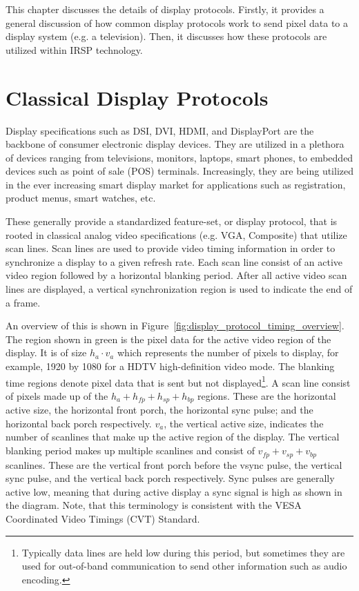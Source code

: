\label{chap:display_protocls}
This chapter discusses the details of display protocols. Firstly, it provides a general discussion of how common display protocols work to send pixel data to a display system (e.g. a television). Then, it discusses how these protocols are utilized within IRSP technology.

\section{Classical Display Protocols}
    \label{sec:classical_display_protocols}

    Display specifications such as DSI\cite{HDMIForum2017}, DVI\cite{DDWG1999}, HDMI\cite{HDMIForum2018}, and DisplayPort\cite{VESA2016} are the backbone of consumer electronic display devices. They are utilized in a plethora of devices ranging from televisions, monitors, laptops, smart phones, to embedded devices such as point of sale (POS) terminals. Increasingly, they are being utilized in the ever increasing smart display market for applications such as registration, product menus, smart watches, etc.

    These generally provide a standardized feature-set, or display protocol, that is rooted in classical analog video specifications (e.g. VGA, Composite)\cite{NIAnalog} that utilize scan lines\cite{Neal1998}. Scan lines are used to provide video timing information in order to synchronize a display to a given refresh rate. Each scan line consist of an active video region followed by a horizontal blanking period. After all active video scan lines are displayed, a vertical synchronization region is used to indicate the end of a frame.


    An overview of this is shown in Figure~\ref{fig:display_protocol_timing_overview}. The region shown in green is the pixel data for the active video region of the display. It is of size $h_a\cdot v_a$ which represents the number of pixels to display, for example, 1920 by 1080 for a HDTV high-definition video mode\cite{MythTVWebsite}. The blanking time regions denote pixel data that is sent but not displayed\footnote{Typically data lines are held low during this period, but sometimes they are used for out-of-band communication to send other information such as audio encoding.}. A scan line consist of pixels made up of the $h_a+h_{fp}+h_{sp}+h_{bp}$ regions. These are the horizontal active size, the horizontal front porch, the horizontal sync pulse; and the horizontal back porch respectively. $v_a$, the vertical active size, indicates the number of scanlines that make up the active region of the display. The vertical blanking period makes up multiple scanlines and consist of $v_{fp}+v_{sp}+v_{bp}$ scanlines. These are the vertical front porch before the vsync pulse, the vertical sync pulse, and the vertical back porch respectively. Sync pulses are generally active low, meaning that during active display a sync signal is high as shown in the diagram. Note, that this terminology is consistent with the VESA Coordinated Video Timings (CVT) Standard\cite{VESA2013}.

